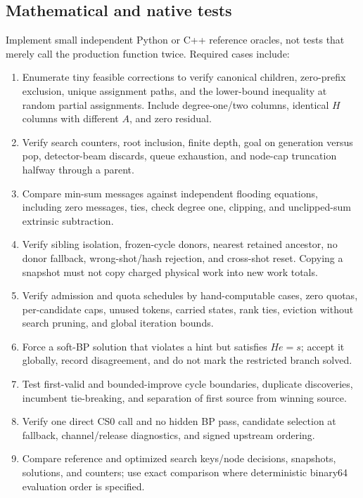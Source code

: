 \documentclass[11pt,a4paper]{article}
\begin{document}
\subsection{Mathematical and native tests}
Implement small independent Python or C++ reference oracles, not tests that merely call the production function twice. Required cases include:
\begin{enumerate}
\item Enumerate tiny feasible corrections to verify canonical children, zero-prefix exclusion, unique assignment paths, and the lower-bound inequality at random partial assignments. Include degree-one/two columns, identical $H$ columns with different $A$, and zero residual.
\item Verify search counters, root inclusion, finite depth, goal on generation versus pop, detector-beam discards, queue exhaustion, and node-cap truncation halfway through a parent.
\item Compare min-sum messages against independent flooding equations, including zero messages, ties, check degree one, clipping, and unclipped-sum extrinsic subtraction.
\item Verify sibling isolation, frozen-cycle donors, nearest retained ancestor, no donor fallback, wrong-shot/hash rejection, and cross-shot reset. Copying a snapshot must not copy charged physical work into new work totals.
\item Verify admission and quota schedules by hand-computable cases, zero quotas, per-candidate caps, unused tokens, carried states, rank ties, eviction without search pruning, and global iteration bounds.
\item Force a soft-BP solution that violates a hint but satisfies $He=s$; accept it globally, record disagreement, and do not mark the restricted branch solved.
\item Test first-valid and bounded-improve cycle boundaries, duplicate discoveries, incumbent tie-breaking, and separation of first source from winning source.
\item Verify one direct CS0 call and no hidden BP pass, candidate selection at fallback, channel/release diagnostics, and signed upstream ordering.
\item Compare reference and optimized search keys/node decisions, snapshots, solutions, and counters; use exact comparison where deterministic binary64 evaluation order is specified.
\end{enumerate}
\end{document}
